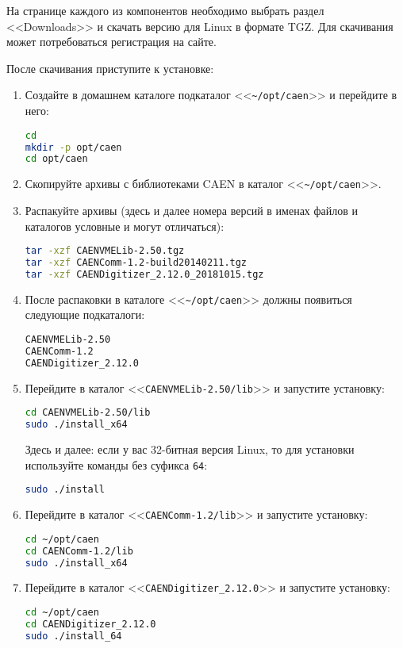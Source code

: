 \documentclass[12pt, a4paper, oneside, onecolumn]{book}
\newcommand{\DIRECTORY}[1]{<<{\tt #1}>>}
\begin{document}
На странице каждого из компонентов необходимо выбрать раздел <<Downloads>> и скачать версию для Linux в формате TGZ. Для скачивания может потребоваться регистрация на сайте.

После скачивания приступите к установке:

\begin{enumerate}

\item Создайте в домашнем каталоге подкаталог \DIRECTORY{\~{}/opt/caen} и перейдите в него:

\begin{lstlisting}[language=bash]
cd
mkdir -p opt/caen
cd opt/caen
\end{lstlisting}

\item Скопируйте архивы с библиотеками CAEN в каталог \DIRECTORY{\~{}/opt/caen}.

\item Распакуйте архивы (здесь и далее номера версий в именах файлов и каталогов условные и могут отличаться):

\begin{lstlisting}[language=bash]
tar -xzf CAENVMELib-2.50.tgz
tar -xzf CAENComm-1.2-build20140211.tgz
tar -xzf CAENDigitizer_2.12.0_20181015.tgz
\end{lstlisting}

\item После распаковки в каталоге \DIRECTORY{\~{}/opt/caen} должны появиться следующие подкаталоги:

\begin{lstlisting}[language=bash]
CAENVMELib-2.50
CAENComm-1.2
CAENDigitizer_2.12.0
\end{lstlisting}

\item Перейдите в каталог \DIRECTORY{CAENVMELib-2.50/lib} и запустите установку:

\begin{lstlisting}[language=bash]
cd CAENVMELib-2.50/lib
sudo ./install_x64
\end{lstlisting}

Здесь и далее: если у вас 32-битная версия Linux, то для установки используйте команды без суфикса {\tt 64}:

\begin{lstlisting}[language=bash]
sudo ./install
\end{lstlisting}

\item Перейдите в каталог \DIRECTORY{CAENComm-1.2/lib} и запустите установку:

\begin{lstlisting}[language=bash]
cd ~/opt/caen
cd CAENComm-1.2/lib
sudo ./install_x64
\end{lstlisting}

\item Перейдите в каталог \DIRECTORY{CAENDigitizer\_2.12.0} и запустите установку:

\begin{lstlisting}[language=bash]
cd ~/opt/caen
cd CAENDigitizer_2.12.0
sudo ./install_64
\end{lstlisting}

\end{enumerate}
\end{document}
